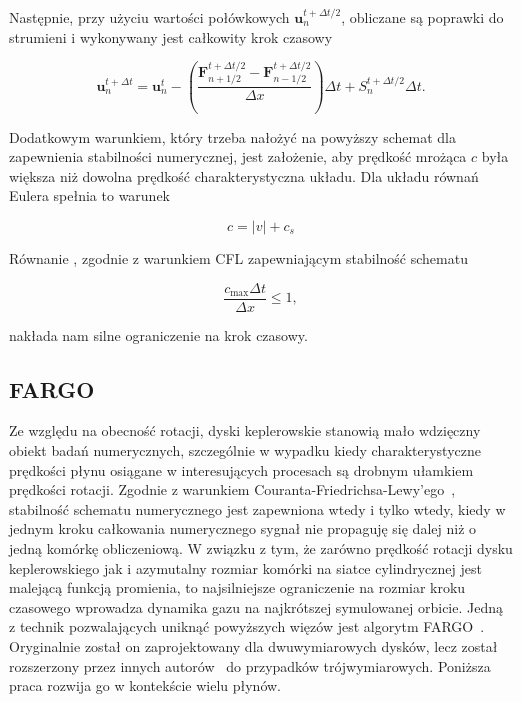 Następnie, przy użyciu wartości połówkowych $\mathbf{u}^{t+\Delta t/2}_{n}$,
obliczane są poprawki do strumieni i wykonywany jest całkowity krok czasowy

\begin{equation}
   \mathbf{u}^{t+\Delta t}_{n} = \mathbf{u}^{t}_{n} -
   \left(\frac{\mathbf{F}^{t+\Delta t/2}_{n+1/2} - \mathbf{F}^{t+\Delta
   t/2}_{n-1/2}}{\Delta x} \right)\Delta t + S_n^{t+\Delta t/2}\Delta t.
\end{equation}

Dodatkowym warunkiem, który trzeba nałożyć na powyższy schemat dla zapewnienia
stabilności numerycznej, jest założenie, aby prędkość mrożąca $c$ była większa
niż dowolna prędkość charakterystyczna układu. Dla układu równań Eulera spełnia
to warunek

\begin{equation}\label{fs}
   c = |v| + c_s
\end{equation}

Równanie , zgodnie z warunkiem CFL zapewniającym stabilność schematu

\begin{equation}\label{cfl}
   \frac{c_{\textrm{max}}\Delta t}{\Delta x} \le 1,
\end{equation}

nakłada nam silne ograniczenie na krok czasowy. 

\subsection{FARGO}
Ze względu na obecność rotacji, dyski keplerowskie stanowią mało wdzięczny
obiekt badań numerycznych, szczególnie w wypadku kiedy charakterystyczne
prędkości płynu osiągane w interesujących procesach są drobnym ułamkiem
prędkości rotacji. Zgodnie z warunkiem Couranta-Friedrichsa-Lewy'ego~\cite{cir},
stabilność schematu numerycznego jest zapewniona wtedy i tylko wtedy, kiedy w
jednym kroku całkowania numerycznego sygnał nie propaguję się dalej niż o jedną
komórkę obliczeniową. W związku z tym, że zarówno prędkość rotacji dysku
keplerowskiego jak i azymutalny rozmiar komórki na siatce cylindrycznej jest
malejącą funkcją promienia, to najsilniejsze ograniczenie na rozmiar kroku
czasowego wprowadza dynamika gazu na najkrótszej symulowanej orbicie. Jedną z
technik pozwalających uniknąć powyższych więzów jest algorytm FARGO~\citep{M00}.
Oryginalnie został on zaprojektowany dla dwuwymiarowych dysków, lecz został
rozszerzony przez innych autorów~\cite{KBK09} do przypadków trójwymiarowych.
Poniższa praca rozwija go w kontekście wielu płynów.

